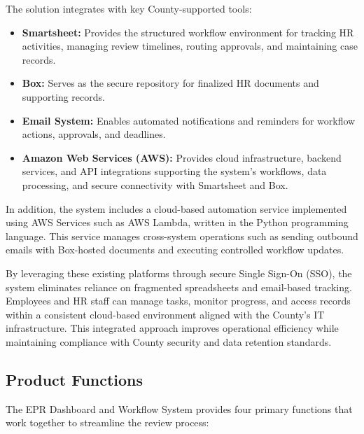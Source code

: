 \documentclass[12pt]{article}
\begin{document}
The solution integrates with key County-supported tools:

\begin{itemize}
  \item \textbf{Smartsheet:} Provides the structured workflow environment for tracking HR activities, managing review timelines, routing approvals, and maintaining case records.
  \item \textbf{Box:} Serves as the secure repository for finalized HR documents and supporting records.
  \item \textbf{Email System:} Enables automated notifications and reminders for workflow actions, approvals, and deadlines.
  \item \textbf{Amazon Web Services (AWS):} Provides cloud infrastructure, backend services, and API integrations supporting the system’s workflows, data processing, and secure connectivity with Smartsheet and Box.
  \end{itemize}

In addition, the system includes a cloud-based automation service implemented using AWS Services such as AWS Lambda, written in the Python programming language. This service manages cross-system operations such as
sending outbound emails with Box-hosted documents and executing controlled workflow updates.

By leveraging these existing platforms through secure Single Sign-On (SSO), the system eliminates reliance on fragmented spreadsheets and email-based tracking. Employees and HR staff can manage tasks, monitor progress, and access records within a consistent cloud-based environment aligned with the County’s IT infrastructure. This integrated approach improves operational efficiency while maintaining compliance with County security and data retention standards.

\subsection{Product Functions}

The EPR Dashboard and Workflow System provides four primary functions that work together to streamline the review process:
\end{document}
